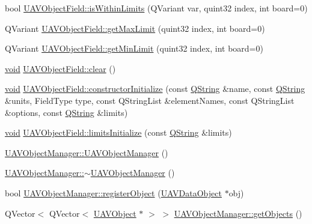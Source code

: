 \begin{DoxyCompactItemize}
\item 
bool \hyperlink{group___u_a_v_objects_plugin_gaab4e295f61848873ab0e45b3546a0035}{\-U\-A\-V\-Object\-Field\-::is\-Within\-Limits} (\-Q\-Variant var, quint32 index, int board=0)
\item 
\-Q\-Variant \hyperlink{group___u_a_v_objects_plugin_gafbe9b468da7decca7c6ff46202b938ba}{\-U\-A\-V\-Object\-Field\-::get\-Max\-Limit} (quint32 index, int board=0)
\item 
\-Q\-Variant \hyperlink{group___u_a_v_objects_plugin_ga3f6a930205ce76977ac96ffcfb864a8d}{\-U\-A\-V\-Object\-Field\-::get\-Min\-Limit} (quint32 index, int board=0)
\item 
\hyperlink{group___u_a_v_objects_plugin_ga444cf2ff3f0ecbe028adce838d373f5c}{void} \hyperlink{group___u_a_v_objects_plugin_ga3d25ad42d17576d9c6218bd1c65345a9}{\-U\-A\-V\-Object\-Field\-::clear} ()
\item 
\hyperlink{group___u_a_v_objects_plugin_ga444cf2ff3f0ecbe028adce838d373f5c}{void} \hyperlink{group___u_a_v_objects_plugin_ga8c808af230791ca079eca575c6c6c1ae}{\-U\-A\-V\-Object\-Field\-::constructor\-Initialize} (const \hyperlink{group___u_a_v_objects_plugin_gab9d252f49c333c94a72f97ce3105a32d}{\-Q\-String} \&name, const \hyperlink{group___u_a_v_objects_plugin_gab9d252f49c333c94a72f97ce3105a32d}{\-Q\-String} \&units, \-Field\-Type type, const \-Q\-String\-List \&element\-Names, const \-Q\-String\-List \&options, const \hyperlink{group___u_a_v_objects_plugin_gab9d252f49c333c94a72f97ce3105a32d}{\-Q\-String} \&limits)
\item 
\hyperlink{group___u_a_v_objects_plugin_ga444cf2ff3f0ecbe028adce838d373f5c}{void} \hyperlink{group___u_a_v_objects_plugin_ga7ceda7a3dfdcca81d80ed887485c4b76}{\-U\-A\-V\-Object\-Field\-::limits\-Initialize} (const \hyperlink{group___u_a_v_objects_plugin_gab9d252f49c333c94a72f97ce3105a32d}{\-Q\-String} \&limits)
\item 
\hyperlink{group___u_a_v_objects_plugin_ga407e523ca4304b00cc600c49f110e60a}{\-U\-A\-V\-Object\-Manager\-::\-U\-A\-V\-Object\-Manager} ()
\item 
\hyperlink{group___u_a_v_objects_plugin_ga0b1af95f366fc372f94307f59513933d}{\-U\-A\-V\-Object\-Manager\-::$\sim$\-U\-A\-V\-Object\-Manager} ()
\item 
bool \hyperlink{group___u_a_v_objects_plugin_gad71bd0967de227335d5fec0b599a54e3}{\-U\-A\-V\-Object\-Manager\-::register\-Object} (\hyperlink{class_u_a_v_data_object}{\-U\-A\-V\-Data\-Object} $\ast$obj)
\item 
\-Q\-Vector$<$ \-Q\-Vector$<$ \hyperlink{class_u_a_v_object}{\-U\-A\-V\-Object} $\ast$ $>$ $>$ \hyperlink{group___u_a_v_objects_plugin_ga90cc8567b44fd696df9fffa8a3f24f0c}{\-U\-A\-V\-Object\-Manager\-::get\-Objects} ()

\end{DoxyCompactItemize}

